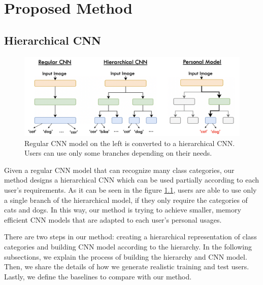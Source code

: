
\lhead[\chaptername~\thechapter]{\rightmark}

\rhead[\leftmark]{}

\lfoot[\thepage]{}

\cfoot{}

\rfoot[]{\thepage}

\chapter{Proposed Method}
\label{method}


\section{Hierarchical CNN}
\label{sec:HierCNN}

\begin{figure}
    \centering
    \includegraphics[width=\textwidth]{thesis/images/hierarchical-cnn-fig.png}
    \caption{Regular CNN model on the left is converted to a hierarchical CNN. Users can use only some branches depending on their needs.}
    \label{fig:hiermethodoverview}
\end{figure}

Given a regular CNN model that can recognize many class categories, our method designs a hierarchical CNN which can be used partially according to each user's requirements. 
As it can be seen in the figure \ref{fig:hiermethodoverview}, users are able to use only a single branch of the hierarchical model, if they only require the categories of cats and dogs. 
In this way, our method is trying to achieve smaller, memory efficient CNN models that are adapted to each user's personal usages.

There are two steps in our method: creating a hierarchical representation of class categories and building CNN model according to the hierarchy.
In the following subsections, we explain the process of building the hierarchy and CNN model. 
Then, we share the details of how we generate realistic training and test users.
Lastly, we define the baselines to compare with our method.

